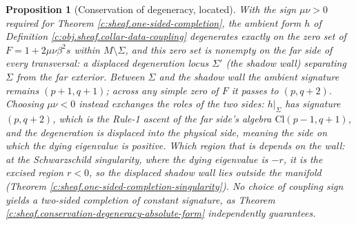 \documentclass[11pt]{article}
\newtheorem{proposition}[theorem]{Proposition}
\theoremstyle{definition}
\theoremstyle{plain}
\newcommand{\changedmark}[2]{\marginpar{\raggedright\scriptsize\color{#1}#2}}
\providecommand{\Cl}{}\renewcommand{\Cl}{\mathrm{Cl}}
\providecommand{\Sig}{}\renewcommand{\Sig}{\Sigma}
\begin{document}
\begin{proposition}[Conservation of degeneracy, located]\label{c:sheaf.conservation-degeneracy-located}
\changedmark{BurntOrange}{changed since the deposit}
With the sign $\mu\nu > 0$ required for Theorem \ref{c:sheaf.one-sided-completion}, the ambient form $h$ of Definition \ref{c:obj.sheaf.collar-data-coupling} degenerates exactly on the zero set of $F = 1 + 2\mu\nu\beta^2 s$ within $M \setminus \Sig$, and this zero set is nonempty on the far side of every transversal: a displaced degeneration locus $\Sig'$ (the \emph{shadow wall}) separating $\Sig$ from the far exterior. Between $\Sig$ and the shadow wall the ambient signature remains $(p{+}1, q{+}1)$; across any simple zero of $F$ it passes to $(p, q{+}2)$. Choosing $\mu\nu < 0$ instead exchanges the roles of the two sides: $h|_\Sig$ has signature $(p, q{+}2)$, which is the Rule-1 ascent of the far side's algebra $\Cl(p{-}1, q{+}1)$, and the degeneration is displaced into the physical side, meaning the side on which the dying eigenvalue is positive. Which region that is depends on the wall: at the Schwarzschild singularity, where the dying eigenvalue is $-r$, it is the excised region $r < 0$, so the displaced shadow wall lies outside the manifold (Theorem \ref{c:sheaf.one-sided-completion-singularity}). No choice of coupling sign yields a two-sided completion of constant signature, as Theorem \ref{c:sheaf.conservation-degeneracy-absolute-form} independently guarantees.
\end{proposition}
\end{document}
